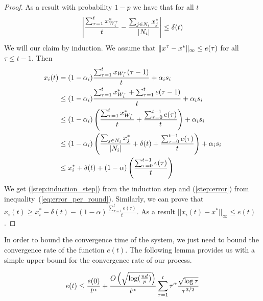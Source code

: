 \begin{proof}
  As a result with probability $1-p$ we have that for all $t$
  \begin{equation}\label{eq:error_per_round}
    \left|
    \frac{\sum_{\tau=1}^t x^*_{W_i^\tau}}{t} -
    \frac{\sum_{j \in N_i} x^*_j}{|N_i|}
    \right| \leq \delta(t)
  \end{equation}
  We will our claim by induction.
  We assume that $\| x^{\tau}-x^* \|_{\infty} \leq e(\tau)$ for all
  $\tau \leq t-1$. Then
  \begin{align}
    x_i(t)
    &=
    (1-\alpha_i)\frac{\sum_{\tau=1}^{t}x_{W_i^{\tau}}(\tau-1)}{t}
    + \alpha_i s_i \nonumber \\
    &\leq
    (1-\alpha_i)\frac{\sum_{\tau=1}^{t}x^*_{W_i^{\tau}} +
      \sum_{\tau=1}^{t} e(\tau-1)}{t} + \alpha_i s_i \label{step:induction_step}\\
    &\leq
    (1-\alpha_i)
    \left(
    \frac{\sum_{\tau=1}^{t}x^*_{W_i^{\tau}}}{t}+
    \frac{\sum_{\tau=0}^{t-1} e(\tau)}{t}
    \right)
    + \alpha_i s_i \nonumber\\
    &\leq
    (1-\alpha_i)\left(\frac{\sum_{j \in N_i}x^*_{j}}{|N_i|} +
    \delta(t) + \frac{\sum_{\tau=0}^{t-1} e(\tau)}{t} \right) +
    \alpha_i s_i \label{step:error} \\
    &\leq
    x_i^* + \delta(t) + (1-\alpha)
    \left(
    \frac{\sum_{\tau=0}^{t-1} e(\tau)}{t}
    \right)
    \nonumber
  \end{align}
  We get (\ref{step:induction_step}) from the induction step and
  (\ref{step:error}) from inequality~(\ref{eq:error_per_round}).
  Similarly, we can prove that
  $x_i(t) \geq x_i^* - \delta(t) - (1-\alpha)
  \frac{\sum_{\tau=1}^t e(\tau)}{t}$.
  As a result $||x_i(t)-x^*||_{\infty} \leq e(t)$.
\end{proof}

In order to bound the convergence time of the system, we just need to bound
the convergence rate of the function $e(t)$.
The following lemma provides us with a simple upper bound for the
convergence rate of our process.

\begin{lemma}
  $$e(t) \leq \frac{e(0)}{t^\alpha} +
  \frac{O\left(\sqrt{\log(\frac{nd}{p})}\right)}{t^\alpha}
  \sum_{\tau=1}^t\tau^\alpha\frac{\sqrt{\log \tau}}{\tau^{3/2}}$$
\end{lemma}

